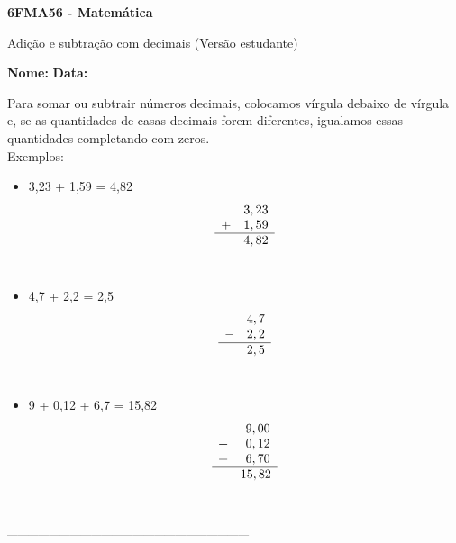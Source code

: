 \documentclass[a4paper,14pt]{article}
\begin{document}
	
	\noindent\textbf{6FMA56 - Matemática} 
	
	\begin{center}Adição e subtração com decimais (Versão estudante)
	\end{center}
	
	\noindent\textbf{Nome:} \underline{\hspace{10cm}}
	\noindent\textbf{Data:} \underline{\hspace{4cm}}
	
	\begin{multicols}{2}
    		\noindent Para somar ou subtrair números decimais, colocamos vírgula debaixo de vírgula e, se as quantidades de casas decimais forem diferentes, igualamos essas quantidades completando com zeros.\\
    		Exemplos: \\
    		\begin{itemize}
    			\item 3,23 + 1,59 = 4,82
    			\[
    			\begin{array}{ccc}
    				 & 3,23 \\
    				+ & 1,59 \\
    				\hline
    				& 4,82
    			\end{array}
    			\] \\
    			\item 4,7 + 2,2 = 2,5
    			\[
    			\begin{array}{ccc}
    				& 4,7 \\
    				- & 2,2 \\
    				\hline
    				& 2,5
    			\end{array}
    			\] \\
    			\item 9 + 0,12 + 6,7 = 15,82
    			\[
    			\begin{array}{ccc}
    				& ~ 9,00 \\
    				+ & ~ 0,12 \\
    				+ & ~ 6,70 \\
    				\hline
    				& 15,82
    			\end{array}
    			\] \\
    		\end{itemize}
    		\textsubscript{---------------------------------------------------------------------}
    		\begin{enumerate}

\end{enumerate}
\end{multicols}
\end{document}
